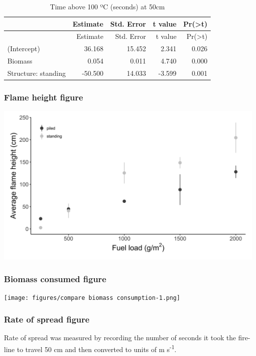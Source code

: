 \documentclass[11pt,a4paper]{article}
\begin{document}
\begin{longtable}[]{@{}lrrrr@{}}
\caption{Time above 100 ºC (seconds) at 50cm}\tabularnewline
\toprule
& Estimate & Std. Error & t value &
Pr(\textgreater{}\textbar{}t\textbar{})\tabularnewline
\midrule
\endfirsthead
\toprule
& Estimate & Std. Error & t value &
Pr(\textgreater{}\textbar{}t\textbar{})\tabularnewline
\midrule
\endhead
(Intercept) & 36.168 & 15.452 & 2.341 & 0.026\tabularnewline
Biomass & 0.054 & 0.011 & 4.740 & 0.000\tabularnewline
Structure: standing & -50.500 & 14.033 & -3.599 & 0.001\tabularnewline
\bottomrule
\end{longtable}

\hypertarget{flame-height-figure}{%
\subsubsection{Flame height figure}\label{flame-height-figure}}

\includegraphics{figures/compare flame height-1.png}

\hypertarget{biomass-consumed-figure}{%
\subsubsection{Biomass consumed figure}\label{biomass-consumed-figure}}

\texttt{[image: figures/compare biomass consumption-1.png]}

\hypertarget{rate-of-spread-figure}{%
\subsubsection{Rate of spread figure}\label{rate-of-spread-figure}}

Rate of spread was measured by recording the number of seconds it took
the fire-line to travel 50 cm and then converted to units of m
s\textsuperscript{-1}.
\end{document}
